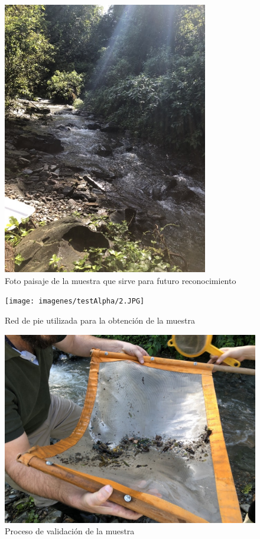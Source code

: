 		\begin{figure}[H]
			\centering
				\includegraphics[width=0.8\textwidth]{imagenes/testAlpha/1.JPG}
					\caption{Foto paisaje de la muestra que sirve para futuro reconocimiento}
		\end{figure}
		\begin{figure}[H]
			\centering
				\texttt{[image: imagenes/testAlpha/2.JPG]}
					\caption{Red de pie utilizada para la obtención de la muestra}
		\end{figure}
		\begin{figure}[H]
			\centering
				\includegraphics[width=1\textwidth]{imagenes/testAlpha/3.JPG}
					\caption{Proceso de validación de la muestra}
		\end{figure}
